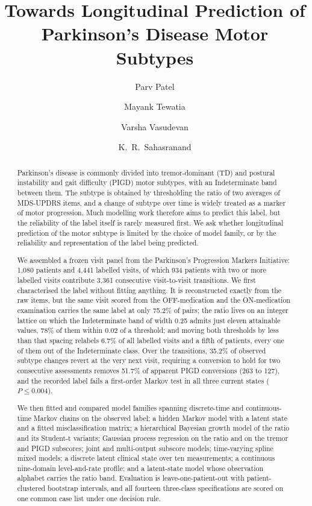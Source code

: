 \documentclass[11pt]{article}
\title{\bfseries Towards Longitudinal Prediction of\\
Parkinson's Disease Motor Subtypes}
\author[1]{Parv Patel}
\author[1]{Mayank Tewatia}
\author[2]{Varsha Vasudevan}
\author[1]{K.~R.~Sahasranand}
\affil[1]{\normalsize Indian Institute of Technology Palakkad, India}
\affil[2]{\normalsize NeuroComp}
\date{}
\begin{document}
\maketitle
\thispagestyle{fancy}

\begin{abstract}
\noindent
Parkinson's disease is commonly divided into tremor-dominant (TD) and postural
instability and gait difficulty (PIGD) motor subtypes, with an Indeterminate
band between them. The subtype is obtained by thresholding the ratio of two
averages of MDS-UPDRS items, and a change of subtype over time is widely
treated as a marker of motor progression. Much modelling work therefore aims to
predict this label, but the reliability of the label itself is rarely measured
first. We ask whether longitudinal prediction of the motor subtype is limited
by the choice of model family, or by the reliability and representation of the
label being predicted.

We assembled a frozen visit panel from the Parkinson's Progression Markers
Initiative: 1,080 patients and 4,441 labelled visits, of which 934 patients with
two or more labelled visits contribute 3,361 consecutive visit-to-visit
transitions. We first characterised the label without fitting anything. It is
reconstructed exactly from the raw items, but the same visit scored from the
OFF-medication and the ON-medication examination carries the same label at only
75.2\% of pairs; the ratio lives on an integer lattice on which the
Indeterminate band of width 0.25 admits just eleven attainable values, 78\% of
them within 0.02 of a threshold; and moving both thresholds by less than that
spacing relabels 6.7\% of all labelled visits and a fifth of patients, every one
of them out of the Indeterminate class. Over the transitions, 35.2\% of observed
subtype changes revert at the very next visit, requiring a conversion to hold
for two consecutive assessments removes 51.7\% of apparent PIGD conversions
(263 to 127), and the recorded label fails a first-order Markov test in all
three current states ($P \leq 0.004$).

We then fitted and compared model families spanning discrete-time and
continuous-time Markov chains on the observed label; a hidden Markov model with
a latent state and a fitted misclassification matrix; a hierarchical Bayesian
growth model of the ratio and its Student-t variants; Gaussian process
regression on the ratio and on the tremor and PIGD subscores; joint and
multi-output subscore models; time-varying spline mixed models; a discrete
latent clinical state over ten measurements; a continuous nine-domain
level-and-rate profile; and a latent-state model whose observation alphabet
carries the ratio band. Evaluation is leave-one-patient-out with
patient-clustered bootstrap intervals, and all fourteen three-class
specifications are scored on one common case list under one decision rule.


\end{abstract}
\end{document}
